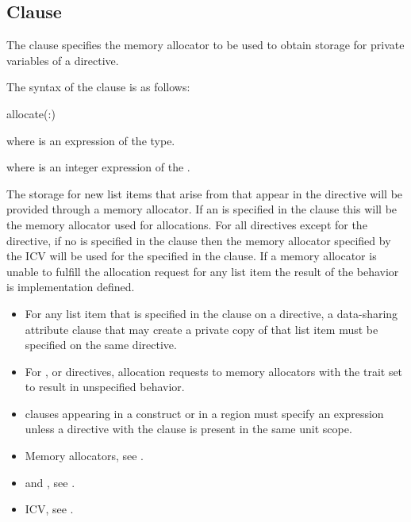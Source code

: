 \subsection{ Clause}
\label{subsec:allocate Clause}
\summary
The  clause specifies the memory allocator to be used to obtain storage for private variables of a directive.

\syntax

The syntax of the  clause is as follows:

\begin{ompSyntax}
allocate(\plc{[allocator}:\plc{] list})
\end{ompSyntax}

\begin{ccppspecific}
where  is an expression of the  type.
\end{ccppspecific}
\begin{fortranspecific}
where  is an integer expression of the  .
\end{fortranspecific}

\descr

The storage for new list items that arise from  that appear in the directive will be provided through a memory allocator. If an  is specified in the clause this will be the memory allocator used for allocations. For all directives except for the  directive, if no  is specified in the clause then the memory allocator specified by the  ICV will be used for the  specified in the  clause. If a memory allocator is unable to fulfill the allocation request for any list item the result of the behavior is implementation defined.

\restrictions
\begin{itemize}
\item For any list item that is specified in the  clause on a directive, a data-sharing attribute clause that may create a private copy of that list item must be specified on the same directive.
\item For ,  or  directives, allocation requests to memory allocators with the trait  set to  result in unspecified behavior.
\item {} clauses appearing in a  construct or in a  region must specify an  expression unless a  directive with the  clause is present in the same unit scope.
\end{itemize}

\crossreferences
\begin{itemize}
\item Memory allocators, see .
\item {} and , see .
\item {} ICV, see .
\end{itemize}
